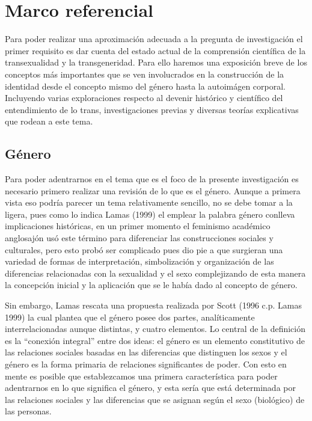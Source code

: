 \chapter{Marco referencial}\label{ch:marcoreferencial}
Para poder realizar una aproximación adecuada a la pregunta de investigación
el primer requisito es dar cuenta del estado actual de la comprensión
científica de la transexualidad y la transgeneridad.
Para ello haremos una exposición breve de los conceptos más importantes que
se ven involucrados en la construcción de la identidad desde el concepto
mismo del género hasta la autoimágen corporal.
Incluyendo varias exploraciones respecto al devenir histórico y científico
del entendimiento de lo trans, investigaciones previas y diversas teorías
explicativas que rodean a este tema.

\section{Género}

Para poder adentrarnos en el tema que es el foco de la presente investigación es
necesario primero realizar una revisión de lo que es el género.
Aunque a primera vista eso podría parecer un tema relativamente sencillo, no se
debe tomar a la ligera, pues como lo indica Lamas (1999) el emplear la palabra
género conlleva implicaciones históricas, en un primer momento el feminismo
académico anglosajón usó este término para diferenciar las construcciones
sociales y culturales, pero esto probó ser complicado pues dio pie a que
surgieran una variedad de formas de interpretación, simbolización y organización
de las diferencias relacionadas con la sexualidad y el sexo complejizando de
esta manera la concepción inicial y la aplicación que se le había dado al
concepto de género.

Sin embargo, Lamas rescata una propuesta realizada por Scott (1996 c.p. Lamas
1999) la cual plantea que el género posee dos
partes, analíticamente interrelacionadas aunque distintas, y cuatro elementos.
Lo central de la definición es la “conexión integral” entre dos ideas: el género
es un elemento constitutivo de las relaciones sociales basadas en las
diferencias que distinguen los sexos y el género es la forma primaria de
relaciones significantes de poder.
Con esto en mente es posible que establezcamos una primera característica para
poder adentrarnos en lo que significa el género, y esta sería que está
determinada por las relaciones sociales y las diferencias que se asignan según
el sexo (biológico) de las personas.

